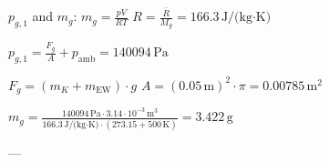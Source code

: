 \( p_{g,1} \) and \( m_g \):  
\( m_g = \frac{p V}{R T} \)  
\( R = \frac{\bar{R}}{M_g} = 166.3 \, \text{J/(kg·K)} \)  

\( p_{g,1} = \frac{F_g}{A} + p_{\text{amb}} = 140094 \, \text{Pa} \)  

\( F_g = (m_K + m_{\text{EW}}) \cdot g \)  
\( A = (0.05 \, \text{m})^2 \cdot \pi = 0.00785 \, \text{m}^2 \)  

\( m_g = \frac{140094 \, \text{Pa} \cdot 3.14 \cdot 10^{-3} \, \text{m}^3}{166.3 \, \text{J/(kg·K)} \cdot (273.15 + 500 \, \text{K})} = 3.422 \, \text{g} \)  

---